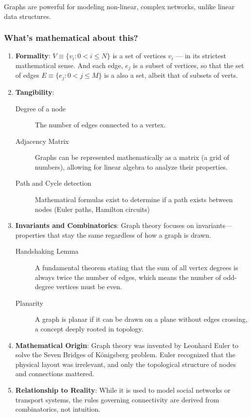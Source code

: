 \documentclass[11pt]{article}
\begin{document}
Graphs are powerful for modeling non-linear, complex
networks, unlike linear data structures.
\subsubsection{What's mathematical about this?}
\label{sec:orgee9815f}

\begin{enumerate}
\item \textbf{Formality}: \(V\equiv \{ v_{i} : 0 < i \leqslant N \}\)
is a set of vertices \(v_i\) --- in its strictest
mathematical sense.  And each edge, \(e_{j}\) is a
subset of vertices, so that the set of edges
\(E\equiv \{e_j : 0 < j \leqslant M \}\) is a also a
set, albeit that of subsets of verts.
\item \textbf{Tangibility}:
\begin{description}
\item[{Degree of a node}] The number of edges connected
to a vertex.
\item[{Adjacency Matrix}] Graphs can be represented
mathematically as a matrix (a grid of numbers),
allowing for linear algebra to analyze their
properties.
\item[{Path and Cycle detection}] Mathematical formulas
exist to determine if a path exists between nodes
(Euler paths, Hamilton circuits)
\end{description}
\item \textbf{Invariants and Combinatorics}: Graph theory focuses
on invariants---properties that stay the same
regardless of how a graph is drawn.
\begin{description}
\item[{Handshaking Lemma}] A fundamental theorem stating
that the sum of all vertex degrees is always twice
the number of edges, which means the number of
odd-degree vertices must be even.
\item[{Planarity}] A graph is planar if it can be drawn
on a plane without edges crossing, a concept
deeply rooted in topology.
\end{description}
\item \textbf{Mathematical Origin}: Graph theory was invented by
Leonhard Euler to solve the Seven Bridges of
Königsberg problem.  Euler recognized that the
physical layout was irrelevant, and only the
topological structure of nodes and connections
mattered.
\item \textbf{Relationship to Reality}: While it is used to model
social networks or transport systems, the rules
governing connectivity are derived from
combinatorics, not intuition.
\end{enumerate}
\end{document}

